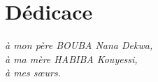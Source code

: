 \chapter*{Dédicace}

\renewcommand{\abstractnamefont}{\normalfont\Large\bfseries}


\hskip7mm
\begin{spacing}{1.3}
	\begin{flushright}
	\itshape
à mon père BOUBA Nana Dekwa,\\
à ma mère HABIBA Kouyessi,\\
à mes sœurs.\\
	\end{flushright}
\end{spacing}
